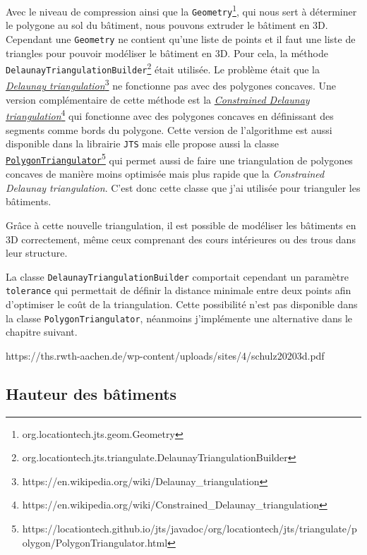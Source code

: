 Avec le niveau de compression ainsi que la \texttt{Geometry}\footnote{org.locationtech.jts.geom.Geometry}, qui nous sert à déterminer le polygone au sol du bâtiment, nous pouvons extruder le bâtiment en 3D. Cependant une \texttt{Geometry} ne contient qu'une liste de points et il faut une liste de triangles pour pouvoir modéliser le bâtiment en 3D. Pour cela, la méthode \texttt{DelaunayTriangulationBuilder}\footnote{org.locationtech.jts.triangulate.DelaunayTriangulationBuilder} était utilisée. Le problème était que la \href{https://en.wikipedia.org/wiki/Delaunay_triangulation}{\textit{Delaunay triangulation}}\footnote{https://en.wikipedia.org/wiki/Delaunay\_triangulation} ne fonctionne pas avec des polygones concaves. Une version complémentaire de cette méthode est la \href{https://en.wikipedia.org/wiki/Constrained_Delaunay_triangulation}{\textit{Constrained Delaunay triangulation}}\footnote{https://en.wikipedia.org/wiki/Constrained\_Delaunay\_triangulation} qui fonctionne avec des polygones concaves en définissant des segments comme bords du polygone. Cette version de l'algorithme est aussi disponible dans la librairie \texttt{JTS} mais elle propose aussi la classe \href{https://locationtech.github.io/jts/javadoc/org/locationtech/jts/triangulate/polygon/PolygonTriangulator.html}{\texttt{PolygonTriangulator}}\footnote{https://locationtech.github.io/jts/javadoc/org/locationtech/jts/triangulate/polygon/PolygonTriangulator.html} qui permet aussi de faire une triangulation de polygones concaves de manière moins optimisée mais plus rapide que la \textit{Constrained Delaunay triangulation}. C'est donc cette classe que j'ai utilisée pour trianguler les bâtiments.

Grâce à cette nouvelle triangulation, il est possible de modéliser les bâtiments en 3D correctement, même ceux comprenant des cours intérieures ou des trous dans leur structure.

La classe \texttt{DelaunayTriangulationBuilder} comportait cependant un paramètre \texttt{tolerance} qui permettait de définir la distance minimale entre deux points afin d'optimiser le coût de la triangulation. Cette possibilité n'est pas disponible dans la classe \texttt{PolygonTriangulator}, néanmoins j'implémente une alternative dans le chapitre suivant.

https://ths.rwth-aachen.de/wp-content/uploads/sites/4/schulz20203d.pdf

\subsection{Hauteur des bâtiments}

